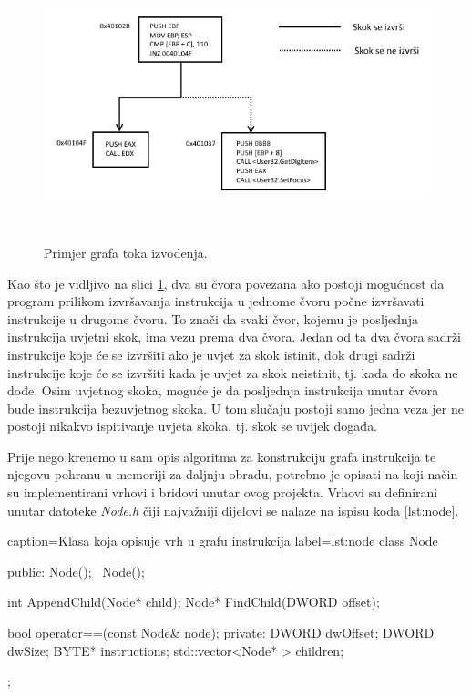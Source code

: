 \documentclass[times, utf8, diplomski, numeric]{fer}
\begin{document}
\begin{figure}[!htb]
\centering
\setlength\fboxsep{0pt}
\setlength\fboxrule{0.5pt}
\includegraphics[width=13cm, height=8cm]{slike/control_flow_graph}
\caption{Primjer grafa toka izvođenja.}
\label{fig:control_flow_graph} 
\end{figure}

Kao što je vidljivo na slici \ref{fig:control_flow_graph}, dva su čvora
povezana ako postoji mogućnost da program prilikom izvršavanja instrukcija
u jednome čvoru počne izvršavati instrukcije u drugome čvoru. To znači da svaki
čvor, kojemu je posljednja instrukcija uvjetni skok, ima vezu prema dva čvora.
Jedan od ta dva čvora sadrži instrukcije koje će se izvršiti ako je uvjet
za skok istinit, dok drugi sadrži instrukcije koje će se izvršiti kada je uvjet
za skok neistinit, tj. kada do skoka ne dođe. Osim uvjetnog skoka, moguće je da
posljednja instrukcija unutar čvora bude instrukcija bezuvjetnog skoka. U tom
slučaju postoji samo jedna veza jer ne postoji nikakvo ispitivanje uvjeta
skoka, tj. skok se uvijek događa.

Prije nego krenemo u sam opis algoritma za konstrukciju grafa instrukcija te
njegovu pohranu u memoriji za daljnju obradu, potrebno je opisati na koji način
su implementirani vrhovi i bridovi unutar ovog projekta. Vrhovi su definirani
unutar datoteke \emph{Node.h} čiji najvažniji dijelovi se nalaze na ispisu koda 
\ref{lst:node}. 

\begin{ispis} {caption=Klasa koja opisuje vrh u grafu instrukcija} {label=lst:node}
class Node
{
public:
	Node();
	~Node();

	int AppendChild(Node* child);
	Node* FindChild(DWORD offset);

	bool operator==(const Node& node);
private:
	DWORD dwOffset;
	DWORD dwSize;
	BYTE* instructions;
	std::vector<Node* > children;
};
\end{ispis}
\end{document}

